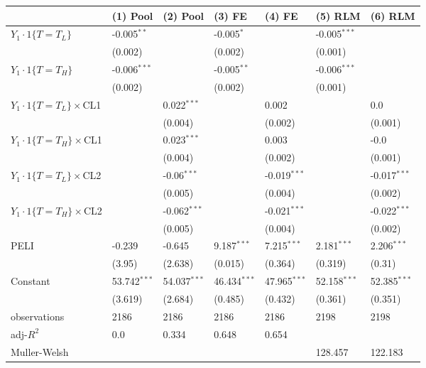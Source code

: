 \begin{tabular}{lllllll}
\hline
 & (1) Pool & (2) Pool & (3) FE & (4) FE & (5) RLM & (6) RLM \\
\hline
$Y_1\cdot1\{T=T_L\}$ & -0.005$^{**}$ &  & -0.005$^{*}$ &  & -0.005$^{***}$ &  \\
 & (0.002) &  & (0.002) &  & (0.001) &  \\
$Y_1\cdot1\{T=T_H\}$ & -0.006$^{***}$ &  & -0.005$^{**}$ &  & -0.006$^{***}$ &  \\
 & (0.002) &  & (0.002) &  & (0.001) &  \\
$Y_1\cdot1\{T=T_L\}\times$CL1 &  & 0.022$^{***}$ &  & 0.002 &  & 0.0 \\
 &  & (0.004) &  & (0.002) &  & (0.001) \\
$Y_1\cdot1\{T=T_H\}\times$CL1 &  & 0.023$^{***}$ &  & 0.003 &  & -0.0 \\
 &  & (0.004) &  & (0.002) &  & (0.001) \\
$Y_1\cdot1\{T=T_L\}\times$CL2 &  & -0.06$^{***}$ &  & -0.019$^{***}$ &  & -0.017$^{***}$ \\
 &  & (0.005) &  & (0.004) &  & (0.002) \\
$Y_1\cdot1\{T=T_H\}\times$CL2 &  & -0.062$^{***}$ &  & -0.021$^{***}$ &  & -0.022$^{***}$ \\
 &  & (0.005) &  & (0.004) &  & (0.002) \\
PELI & -0.239 & -0.645 & 9.187$^{***}$ & 7.215$^{***}$ & 2.181$^{***}$ & 2.206$^{***}$ \\
 & (3.95) & (2.638) & (0.015) & (0.364) & (0.319) & (0.31) \\
Constant & 53.742$^{***}$ & 54.037$^{***}$ & 46.434$^{***}$ & 47.965$^{***}$ & 52.158$^{***}$ & 52.385$^{***}$ \\
 & (3.619) & (2.684) & (0.485) & (0.432) & (0.361) & (0.351) \\\hline

observations & 2186 & 2186 & 2186 & 2186 & 2198 & 2198 \\
adj-$R^2$ & 0.0 & 0.334 & 0.648 & 0.654 &  &  \\
Muller-Welsh &  &  &  &  & 128.457 & 122.183 \\
\hline
\end{tabular}
